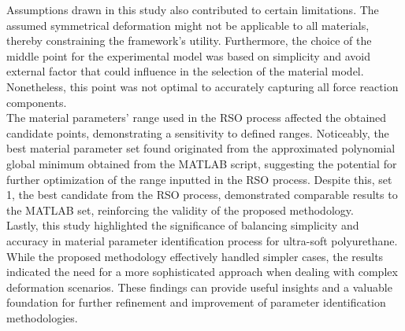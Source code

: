 Assumptions drawn in this study also contributed to certain limitations. The assumed symmetrical
deformation might not be applicable to all materials, thereby constraining the framework's
utility. Furthermore, the choice of the middle point for the experimental model was based on
simplicity and avoid external factor that could influence in the selection of the material 
model. Nonetheless, this point was not optimal to accurately capturing all force reaction 
components.\\

The material parameters' range used in the RSO process affected the obtained candidate points, 
demonstrating a sensitivity to defined ranges. Noticeably, the best material parameter set 
found originated from the approximated polynomial global minimum obtained from the MATLAB script, 
suggesting the potential for further optimization of the range inputted in the RSO process. 
Despite this, set \SI{1}{}, the best candidate from the RSO process, demonstrated comparable 
results to the MATLAB set, reinforcing the validity of the proposed methodology.\\

Lastly, this study highlighted the significance
of balancing simplicity and accuracy in material parameter identification process for ultra-soft polyurethane. 
While the proposed methodology effectively handled simpler cases, the results indicated
the need for a more sophisticated approach when dealing with complex deformation scenarios.
These findings can provide useful insights and a valuable foundation for further refinement and 
improvement of parameter identification methodologies.








